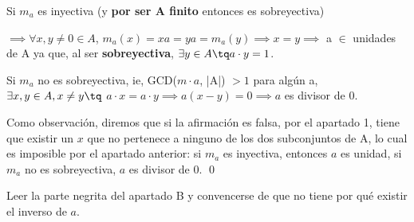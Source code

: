 \begin{problem}[10]
	Si $m_a$ es inyectiva (y {\bf por ser A finito} entonces es sobreyectiva)

	$\implies \forall x,y \neq 0 \in A$, $m_a(x) = xa = ya = m_a(y) \implies x = y \implies $ a $\in $ unidades de A ya que, al ser {\bf sobreyectiva}, $\exists y \in A \tq a\cdot y = 1$.

	Si $m_a$ no es sobreyectiva, ie, GCD($m\cdot a$, |A|) $> 1$ para algún a, $\exists x,y \in A, x \neq y \tq$ $a \cdot x = a \cdot y \implies a (x - y) = 0 \implies a$ es divisor de 0.

	\spart[c]

	Como observación, diremos que si la afirmación es falsa, por el apartado 1, tiene que existir un $x$ que no pertenece a ninguno de los dos subconjuntos de A, lo cual es imposible por el apartado anterior: si $m_a$ es inyectiva, entonces $a$ es unidad, si $m_a$ no es sobreyectiva, $a$ es divisor de 0.
\newline\qed

	\spart[d]

	Leer la parte negrita del apartado B y convencerse de que no tiene por qué existir el inverso de $a$.

\end{problem}





